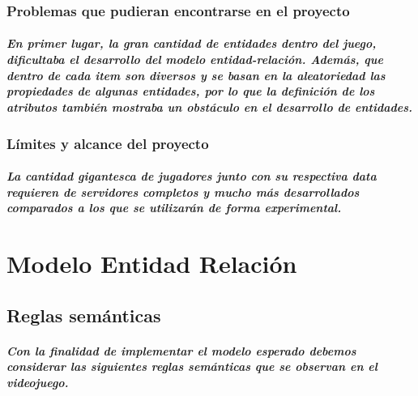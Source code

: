 \documentclass{report}
\begin{document}
\subsection{Problemas que pudieran encontrarse en el proyecto}
\paragraph{En primer lugar, la gran cantidad de entidades dentro del juego, dificultaba el desarrollo del modelo entidad-relación. Además, que dentro de cada item son diversos y se basan en la aleatoriedad las propiedades de algunas entidades, por lo que la definición de los atributos también mostraba un obstáculo en el desarrollo de entidades.}

\subsection{Límites y alcance del proyecto}
\paragraph{La cantidad gigantesca de jugadores junto con su respectiva data requieren de servidores completos y mucho más desarrollados comparados a los que se utilizarán de forma experimental.}

\chapter{Modelo Entidad Relación}
\section{Reglas semánticas}
\paragraph{Con la finalidad de implementar el modelo esperado debemos considerar las siguientes reglas semánticas que se observan en el videojuego.}
\end{document}
